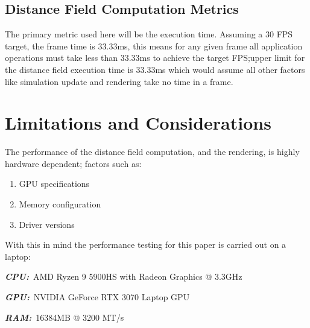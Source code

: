 \subsection{Distance Field Computation Metrics}\label{sec:distance_field_metrics}
The primary metric used here will be the execution time. Assuming a 30 FPS target, the frame time is 33.33ms, this means
for any given frame all application operations must take less than 33.33ms to achieve the target FPS;\@the upper
limit for the distance field execution time is 33.33ms which would assume all other factors like simulation update and
rendering take no time in a frame.

\section{Limitations and Considerations}
The performance of the distance field computation, and the rendering, is highly hardware dependent; factors such as:

\begin{enumerate}
    \item GPU specifications
    \item Memory configuration
    \item Driver versions
\end{enumerate}

With this in mind the performance testing for this paper is carried out on a laptop:

\begin{description}
    \item \textbf{\textit{CPU:}}~AMD Ryzen 9 5900HS with Radeon Graphics @ 3.3GHz
    \item \textbf{\textit{GPU:}}~NVIDIA GeForce RTX 3070 Laptop GPU
    \item \textbf{\textit{RAM:}}~16384MB @ 3200 MT/s
\end{description}
